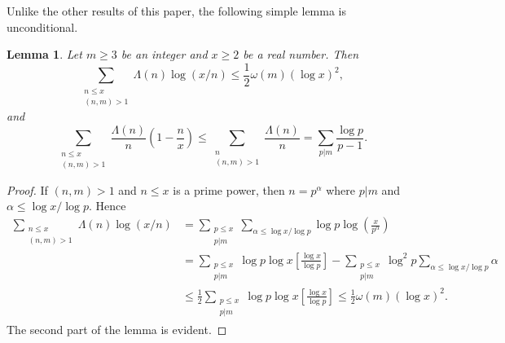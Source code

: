 \documentclass [12pt]{amsart}
\newtheorem{lemma}{Lemma}[section]
\numberwithin{equation}{section}
\begin{document}
\noindent  Unlike the other results of this paper, the following simple lemma is unconditional.

 \begin{lemma}\label{lem5}
Let $m\geq 3$ be an integer and $x\geq 2$ be a real number.  Then
$$\sum_{\substack{n\leq x\\(n,m)>1}}\Lambda(n)\log(x/n)
\leq \frac{1}{2}\omega(m)(\log x)^2,
$$
and
$$ \sum_{\substack{n\leq x\\(n,m)>1}}\frac{\Lambda(n)}{n}\left(1-\frac{n}{x}\right)\leq \sum_{\substack {n \\ (n,m)>1}} \frac{\Lambda(n)}{n} = \sum_{p|m}\frac{\log p}{p-1}.
$$
\end{lemma}
\begin{proof}
If $(n,m)>1$ and $n\leq x$ is a prime power, then $n=p^{\alpha}$ where $p|m$ and $\alpha\leq \log x/\log p$. Hence
\begin{align*}
\sum_{\substack{n\leq x\\(n,m)>1}}\Lambda(n)\log(x/n)&=
\sum_{\substack{p\leq x\\ p|m}}\sum_{\alpha\leq \log x/\log p}\log p\log\left(\frac{x}{p^{\alpha}}\right)\\
&= \sum_{\substack{p\leq x\\ p|m}}\log p\log x\left[\frac{\log x}{\log p}\right] -
\sum_{\substack{p\leq x\\ p|m}}\log^2 p\sum_{\alpha\leq \log x/\log p}\alpha\\
&\leq \frac{1}{2}\sum_{\substack{p\leq x\\ p|m}}\log p\log x\left[\frac{\log x}{\log p}\right] \leq \frac{1}{2}\omega(m)(\log x)^2.
\end{align*}
The second part of the lemma is evident. 
\end{proof}
\end{document}
